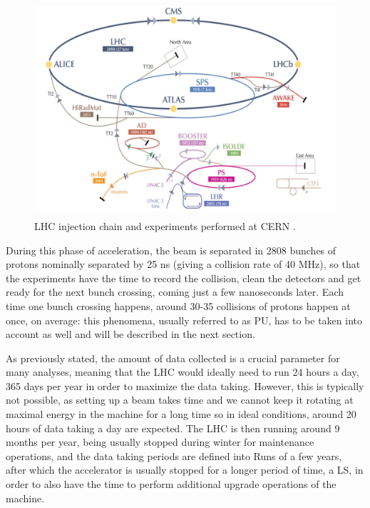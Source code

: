\documentclass[a4paper, 10pt, openright]{report}
\begin{document}
\begin{figure}[htbp]
\begin{center}
\includegraphics[width=12cm, height=8cm]{figs/LHCChain.png}
\caption{LHC injection chain and experiments performed at \ac{CERN} \cite{AWAKE}.}
\label{fig:Chain}
\end{center}
\end{figure}

During this phase of acceleration, the beam is separated in 2808 bunches of protons nominally separated by 25 ns (giving a collision rate of 40 MHz), so that the experiments have the time to record the collision, clean the detectors and get ready for the next bunch crossing, coming just a few nanoseconds later. Each time one bunch crossing happens, around 30-35 collisions of protons happen at once, on average: this phenomena, usually referred to as \ac{PU}, has to be taken into account as well and will be described in the next section.

As previously stated, the amount of data collected is a crucial parameter for many analyses, meaning that the \ac{LHC} would ideally need to run 24 hours a day, 365 days per year in order to maximize the data taking. However, this is typically not possible, as setting up a beam takes time and we cannot keep it rotating at maximal energy in the machine for a long time so in ideal conditions, around 20 hours of data taking a day are expected. The \ac{LHC} is then running around 9 months per year, being usually stopped during winter for maintenance operations, and the data taking periods are defined into Runs of a few years, after which the accelerator is usually stopped for a longer period of time, a \ac{LS}, in order to also have the time to perform additional upgrade operations of the machine. 
\end{document}
